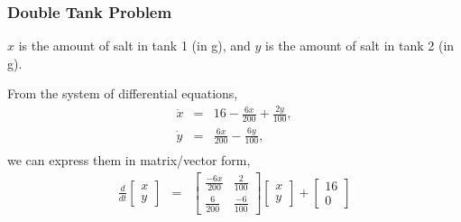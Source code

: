 \begin{frame}
  \frametitle{Double Tank Problem}

    $x$ is the amount of salt in tank 1 (in g), and $y$ is the amount of salt in tank 2 (in g).

    From the system of differential equations,
    \begin{eqnarray*}
      \dot{x} & = & 16 - \frac{6x}{200} + \frac{2y}{100}, \\
      \dot{y} & = &  \frac{6x}{200} - \frac{6y}{100}, \\
    \end{eqnarray*}
    we can express them in matrix/vector form,
    \begin{eqnarray*}
      \frac{d}{dt} \left[
        \begin{array}{l}
          x \\ y
        \end{array}
      \right]
      & = & 
      \left[
        \begin{array}{ll}
          \frac{-6x}{200} & \frac{2}{100}  \\ 
          \frac{6}{200}   & \frac{-6}{100} 
        \end{array}
      \right]
      \left[
        \begin{array}{l}
          x \\ y
        \end{array}
        \right]
        +
        \left[
        \begin{array}{l}
          16 \\ 0
        \end{array}
        \right]
    \end{eqnarray*}


\end{frame}




